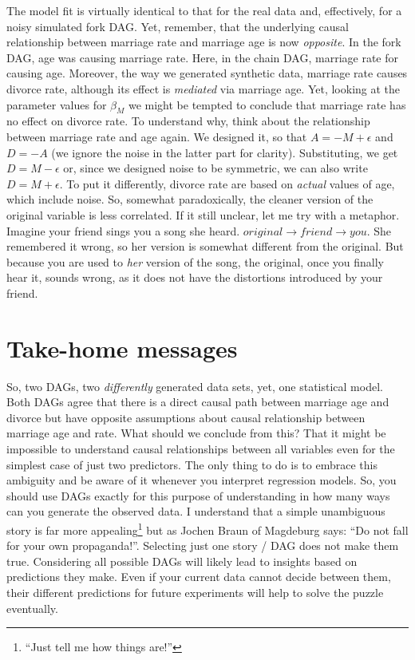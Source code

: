 \documentclass[
]{book}
\begin{document}
The model fit is virtually identical to that for the real data and, effectively, for a noisy simulated fork DAG. Yet, remember, that the underlying causal relationship between marriage rate and marriage age is now \emph{opposite}. In the fork DAG, age was causing marriage rate. Here, in the chain DAG, marriage rate for causing age. Moreover, the way we generated synthetic data, marriage rate causes divorce rate, although its effect is \emph{mediated} via marriage age. Yet, looking at the parameter values for \(\beta_M\) we might be tempted to conclude that marriage rate has no effect on divorce rate. To understand why, think about the relationship between marriage rate and age again. We designed it, so that \(A = -M + \epsilon\) and \(D = -A\) (we ignore the noise in the latter part for clarity). Substituting, we get \(D = M - \epsilon\) or, since we designed noise to be symmetric, we can also write \(D = M + \epsilon\). To put it differently, divorce rate are based on \emph{actual} values of age, which include noise. So, somewhat paradoxically, the cleaner version of the original variable is less correlated. If it still unclear, let me try with a metaphor. Imagine your friend sings you a song she heard. \(original \rightarrow friend \rightarrow you\). She remembered it wrong, so her version is somewhat different from the original. But because you are used to \emph{her} version of the song, the original, once you finally hear it, sounds wrong, as it does not have the distortions introduced by your friend.

\hypertarget{take-home-messages}{%
\section{Take-home messages}\label{take-home-messages}}

So, two DAGs, two \emph{differently} generated data sets, yet, one statistical model. Both DAGs agree that there is a direct causal path between marriage age and divorce but have opposite assumptions about causal relationship between marriage age and rate. What should we conclude from this? That it might be impossible to understand causal relationships between all variables even for the simplest case of just two predictors. The only thing to do is to embrace this ambiguity and be aware of it whenever you interpret regression models. So, you should use DAGs exactly for this purpose of understanding in how many ways can you generate the observed data. I understand that a simple unambiguous story is far more appealing\footnote{``Just tell me how things are!''} but as Jochen Braun of Magdeburg says: ``Do not fall for your own propaganda!''. Selecting just one story / DAG does not make them true. Considering all possible DAGs will likely lead to insights based on predictions they make. Even if your current data cannot decide between them, their different predictions for future experiments will help to solve the puzzle eventually.
\end{document}

